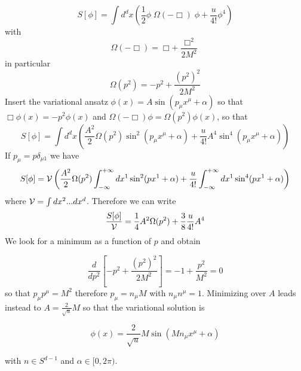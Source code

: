 \documentclass{article}
\begin{document}
\begin{equation}
S[\phi]= \int d^dx\left ( \frac{1}{2}\phi\; \Omega(-\Box)\;\phi+\frac{u}{4!}\phi^4\right)
\end{equation}
with
\begin{equation}
\Omega(-\Box) = \Box+\frac{\Box^2}{2 M^2}
\end{equation}
in particular
\begin{equation}
\Omega(p^2) = -p^2+\frac{(p^2)^2}{2 M^2}
\end{equation}
Insert the variational ansatz $\phi(x) = A\sin (p_\mu x^\mu+\alpha)$ so that $\Box\phi(x) = -p^2 \phi(x)$ 
and $\Omega(-\Box)\phi= \Omega(p^2) \phi(x)$, so that 
\begin{equation}
S[\phi]=\int d^d x \left ( \frac{A^2}{2}\Omega(p^2)\sin^2(p_\mu x^\mu+\alpha)+\frac{u}{4!}A^4 \sin^4(p_\mu x^\mu+\alpha)\right )
\end{equation}
If $p_\mu = p \delta_{\mu 1}$ we have 
\begin{equation}
S[\phi]={\cal V}\left ( \frac{A^2}{2}\Omega(p^2) \int_{-\infty}^{+\infty}dx^1\sin^2(p x^1 +\alpha)+
\frac{u}{4!}\int_{-\infty}^{+\infty}dx^1\sin^4(p x^1 +\alpha) \right )
\end{equation}
where ${\cal V} = \int dx^2...dx^d$. Therefore we can write
\begin{equation}
\frac{S[\phi]}{{\cal V}}= \frac{1}{4}A^2\Omega(p^2)+\frac{3}{8}\frac{u}{4!} A^4
\end{equation}
We look for a minimum as a function of $p$ and obtain

\begin{equation}
\frac{d}{d p^2} \left [-p^2+\frac{(p^2)^2}{2M^2} \right ]=-1+\frac{p^2}{M^2}=0
\end{equation}
so that $p_\mu p^\mu= M^2$ therefore $p_\mu= n_\mu M$ with $n_\mu n^\mu = 1$. Minimizing over $A$ leads instead to $A=\frac{2}{\sqrt{u}}M$
so that the variational solution is

\begin{equation}
\phi(x) = \frac{2}{\sqrt{u}}M\sin(M n_\mu x^\mu+\alpha)
\end{equation}

with $n\in  S^{d-1}$ and $\alpha\in [0,2\pi)$.
\end{document}
